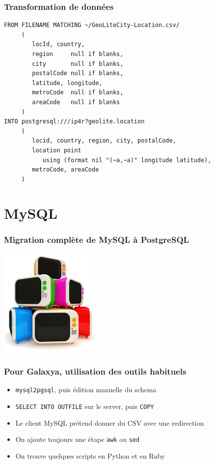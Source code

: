 \documentclass{beamer}
\begin{document}
\begin{frame}[fragile]
  \frametitle{Transformation de données}

  \begin{verbatim}
FROM FILENAME MATCHING ~/GeoLiteCity-Location.csv/
     (
        locId, country,
        region     null if blanks,
        city       null if blanks,
        postalCode null if blanks,
        latitude, longitude,
        metroCode  null if blanks,
        areaCode   null if blanks
     )
INTO postgresql:///ip4r?geolite.location
     (
        locid, country, region, city, postalCode,
        location point
           using (format nil "(~a,~a)" longitude latitude),
        metroCode, areaCode
     )
  \end{verbatim}
\end{frame}

\section{MySQL}

\begin{frame}
  \frametitle{Migration complète de MySQL à PostgreSQL}

  
  \begin{center}
    \includegraphics[height=2.1in]{tv.png}
  \end{center}
\end{frame}

\begin{frame}[fragile]
  \frametitle{Pour Galaxya, utilisation des outils habituels}
  
  \vfill

  \begin{itemize}
  \item \texttt{mysql2pgsql}, puis édition manuelle du schema
  \item \texttt{SELECT INTO OUTFILE} sur le server, puis \texttt{COPY}
  \item Le client MySQL prétend donner du CSV avec une redirection
  \item On ajoute toujours une étape \texttt{awk} ou \texttt{sed}
  \item On trouve quelques scripts en Python et en Ruby
  \end{itemize}  
\end{frame}
\end{document}
